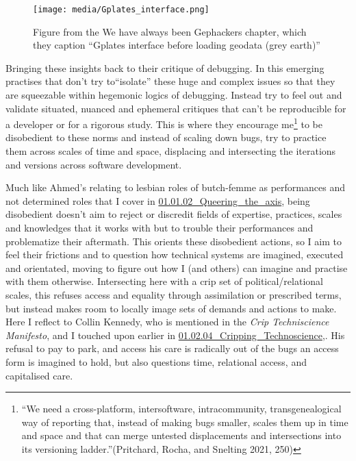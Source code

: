 \begin{figure}
\hypertarget{fig:grey}{%
\centering
\texttt{[image: media/Gplates\_interface.png]}
\caption{Figure from the We have always been Gephackers chapter, which
they caption ``Gplates interface before loading geodata (grey
earth)''}\label{fig:grey}
}
\end{figure}

Bringing these insights back to their critique of debugging. In this
emerging practises that don't try to``isolate'' these huge and complex
issues so that they are squeezable within hegemonic logics of debugging.
Instead try to feel out and validate situated, nuanced and ephemeral
critiques that can't be reproducible for a developer or for a rigorous
study. This is where they encourage me\footnote{``We need a
  cross-platform, intersoftware, intracommunity, transgenealogical way
  of reporting that, instead of making bugs smaller, scales them up in
  time and space and that can merge untested displacements and
  intersections into its versioning ladder.''(Pritchard, Rocha, and
  Snelting 2021, 250)} to be disobedient to these norms and instead of
scaling down bugs, try to practice them across scales of time and space,
displacing and intersecting the iterations and versions across software
development.

Much like Ahmed's relating to lesbian roles of butch-femme as
performances and not determined roles that I cover in
\href{../../01_Disability_justice_and_life_affirmation_flipping_the_table/sections/01.01.02_Queering_the_axis.md}{01.01.02\_Queering\_the\_axis},
being disobedient doesn't aim to reject or discredit fields of
expertise, practices, scales and knowledges that it works with but to
trouble their performances and problematize their aftermath. This
orients these disobedient actions, so I aim to feel their frictions and
to question how technical systems are imagined, executed and orientated,
moving to figure out how I (and others) can imagine and practise with
them otherwise. Intersecting here with a crip set of
political/relational scales, this refuses access and equality through
assimilation or prescribed terms, but instead makes room to locally
image sets of demands and actions to make. Here I reflect to Collin
Kennedy, who is mentioned in the \emph{Crip Techniscience Manifesto},
and I touched upon earlier in
\href{../../01_Disability_justice_and_life_affirmation_flipping_the_table/sections/01.02.04_Cripping_Technoscience.md}{01.02.04\_Cripping\_Technoscience},.
His refusal to pay to park, and access his care is radically out of the
bugs an access form is imagined to hold, but also questions time,
relational access, and capitalised care.

